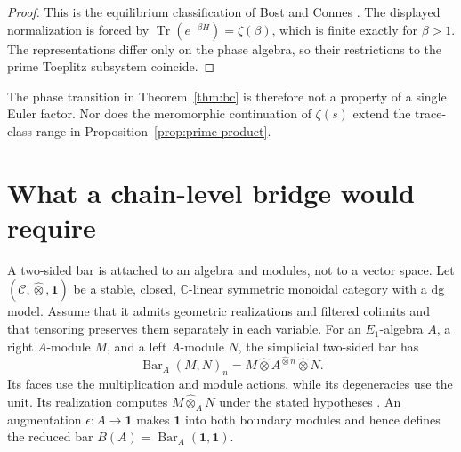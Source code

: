 \documentclass[11pt]{article}
\theoremstyle{plain}
\theoremstyle{definition}
\theoremstyle{remark}
\newcommand{\one}{\mathbf 1}
\begin{document}
\begin{proof}
This is the equilibrium classification of Bost and Connes
\cite[Propositions~18, 21, 23--25 and \S7]{BostConnes1995}.  The displayed
normalization is forced by
\(\operatorname{Tr}(e^{-\beta H})=\zeta(\beta)\), which is finite exactly
for \(\beta>1\).  The representations differ only on the phase algebra,
so their restrictions to the prime Toeplitz subsystem coincide.
\end{proof}

The phase transition in Theorem~\ref{thm:bc} is therefore not a property
of a single Euler factor.  Nor does the meromorphic continuation of
\(\zeta(s)\) extend the trace-class range in
Proposition~\ref{prop:prime-product}.

\section{What a chain-level bridge would require}

A two-sided bar is attached to an algebra and modules, not to a vector
space.  Let \((\mathcal C,\widehat\otimes,\one)\) be a stable, closed,
\(\mathbb C\)-linear symmetric monoidal category with a dg model.  Assume
that it admits geometric realizations and filtered colimits and that
tensoring preserves them separately in each variable.  For an
\(E_1\)-algebra \(A\), a right \(A\)-module \(M\), and a left
\(A\)-module \(N\), the simplicial two-sided bar has
\[
 \operatorname{Bar}_A(M,N)_n
 =M\widehat\otimes A^{\widehat\otimes n}\widehat\otimes N.
\]
Its faces use the multiplication and module actions, while its degeneracies
use the unit.  Its realization computes \(M\widehat\otimes_A N\) under the
stated hypotheses
\cite[Construction~4.4.2.7 and Theorem~4.4.2.8]{LurieHA}.  An augmentation
\(\epsilon:A\to\one\) makes \(\one\) into both boundary modules and hence
defines the reduced bar \(B(A)=\operatorname{Bar}_A(\one,\one)\).
\end{document}
